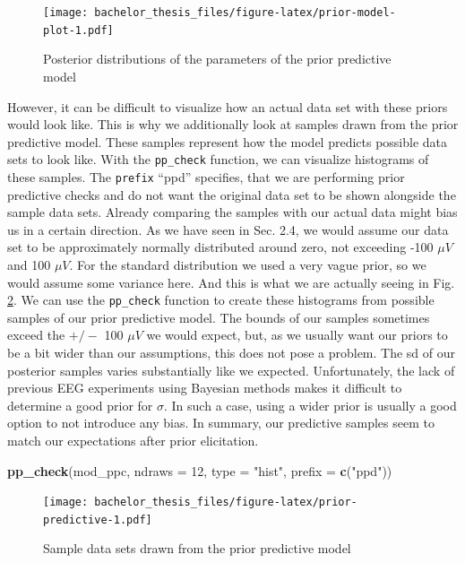 \documentclass[
  doc,12pt,floatsintext]{apa7}
\newenvironment{Shaded}{\begin{snugshade}}{\end{snugshade}}
\newcommand{\AttributeTok}[1]{\textcolor[rgb]{0.13,0.29,0.53}{#1}}
\newcommand{\DecValTok}[1]{\textcolor[rgb]{0.00,0.00,0.81}{#1}}
\newcommand{\FunctionTok}[1]{\textcolor[rgb]{0.13,0.29,0.53}{\textbf{#1}}}
\newcommand{\NormalTok}[1]{#1}
\newcommand{\StringTok}[1]{\textcolor[rgb]{0.31,0.60,0.02}{#1}}
\begin{document}
\begin{figure}
\centering
\texttt{[image: bachelor\_thesis\_files/figure-latex/prior-model-plot-1.pdf]}
\caption{\label{fig:prior-model-plot}Posterior distributions of the parameters of the prior predictive model}
\end{figure}

However, it can be difficult to visualize how an actual data set with these priors would look like. This is why we additionally look at samples drawn from the prior predictive model. These samples represent how the model predicts possible data sets to look like. With the \texttt{pp\_check} function, we can visualize histograms of these samples. The \texttt{prefix} ``ppd'' specifies, that we are performing prior predictive checks and do not want the original data set to be shown alongside the sample data sets. Already comparing the samples with our actual data might bias us in a certain direction. As we have seen in Sec. 2.4, we would assume our data set to be approximately normally distributed around zero, not exceeding -100 \(\mu V\) and 100 \(\mu V\). For the standard distribution we used a very vague prior, so we would assume some variance here. And this is what we are actually seeing in Fig. \ref{fig:prior-predictive}. We can use the \texttt{pp\_check} function to create these histograms from possible samples of our prior predictive model. The bounds of our samples sometimes exceed the \(+/-\) 100 \(\mu V\) we would expect, but, as we usually want our priors to be a bit wider than our assumptions, this does not pose a problem. The sd of our posterior samples varies substantially like we expected. Unfortunately, the lack of previous EEG experiments using Bayesian methods makes it difficult to determine a good prior for \(\sigma\). In such a case, using a wider prior is usually a good option to not introduce any bias. In summary, our predictive samples seem to match our expectations after prior elicitation.



\begin{Shaded}
\begin{Highlighting}[]
\FunctionTok{pp\_check}\NormalTok{(mod\_ppc, }\AttributeTok{ndraws =} \DecValTok{12}\NormalTok{, }\AttributeTok{type =} \StringTok{"hist"}\NormalTok{, }\AttributeTok{prefix =} \FunctionTok{c}\NormalTok{(}\StringTok{"ppd"}\NormalTok{))}
\end{Highlighting}
\end{Shaded}

\begin{figure}
\centering
\texttt{[image: bachelor\_thesis\_files/figure-latex/prior-predictive-1.pdf]}
\caption{\label{fig:prior-predictive}Sample data sets drawn from the prior predictive model}
\end{figure}
\end{document}

